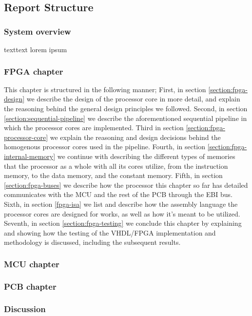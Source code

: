 \subsection{Report Structure}

\FloatBarrier
\subsubsection{System overview}
texttext lorem ipsum

\FloatBarrier
\subsubsection{FPGA chapter}
This chapter is structured in the following manner; First, in section
\ref{section:fpga-design} we describe the design of the processor core in more
detail, and explain the reasoning behind the general design principles we
followed. Second, in section \ref{section:sequential-pipeline} we describe the
aforementioned sequential pipeline in which the processor cores are implemented.
Third in section \ref{section:fpga-processor-core} we explain the reasoning and
design decisions behind the homogenous processor cores used in the pipeline.
Fourth, in section \ref{section:fpga-internal-memory} we continue with
describing the different types of memories that the processor as a whole with
all its cores utilize, from the instruction memory, to the data memory, and the
constant memory. Fifth, in section \ref{section:fpga-buses} we describe how the
processor this chapter so far has detailed communicates with the MCU and the
rest of the PCB through the EBI bus. Sixth, in section \ref{fpga-isa} we list
and describe how the assembly language the processor cores are designed for
works, as well as how it's meant to be utilized. Seventh, in section
\ref{section:fpga-testing} we conclude this chapter by explaining and showing
how the testing of the   VHDL/FPGA
implementation and methodology is discussed, including the subsequent results.

\FloatBarrier
\subsubsection{MCU chapter}

\FloatBarrier
\subsubsection{PCB chapter}

\FloatBarrier
\subsubsection{Discussion}
